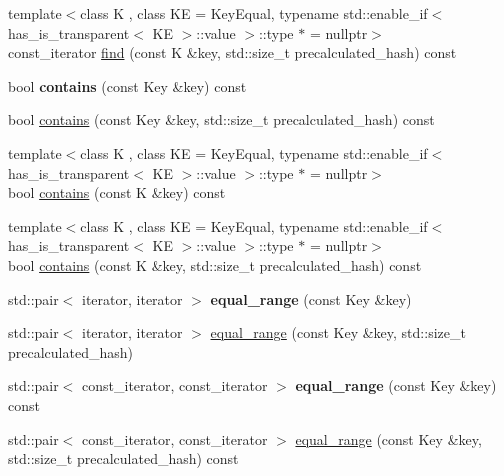 \begin{DoxyCompactItemize}
\item 
{\footnotesize template$<$class K , class KE  = Key\+Equal, typename std\+::enable\+\_\+if$<$ has\+\_\+is\+\_\+transparent$<$ K\+E $>$\+::value $>$\+::type $\ast$  = nullptr$>$ }\\const\+\_\+iterator \mbox{\hyperlink{classtsl_1_1ordered__set_a9b56494c36c62b257971a5c89ce43ace}{find}} (const K \&key, std\+::size\+\_\+t precalculated\+\_\+hash) const
\item 
\mbox{\label{classtsl_1_1ordered__set_a75f3c4a9c769412558086ce4b9646f79}} 
bool {\bfseries contains} (const Key \&key) const
\item 
bool \mbox{\hyperlink{classtsl_1_1ordered__set_a95347e23841cb607b1fe291da16a045a}{contains}} (const Key \&key, std\+::size\+\_\+t precalculated\+\_\+hash) const
\item 
{\footnotesize template$<$class K , class KE  = Key\+Equal, typename std\+::enable\+\_\+if$<$ has\+\_\+is\+\_\+transparent$<$ K\+E $>$\+::value $>$\+::type $\ast$  = nullptr$>$ }\\bool \mbox{\hyperlink{classtsl_1_1ordered__set_a90f5653e37108274b91d34666a9ef7a9}{contains}} (const K \&key) const
\item 
{\footnotesize template$<$class K , class KE  = Key\+Equal, typename std\+::enable\+\_\+if$<$ has\+\_\+is\+\_\+transparent$<$ K\+E $>$\+::value $>$\+::type $\ast$  = nullptr$>$ }\\bool \mbox{\hyperlink{classtsl_1_1ordered__set_a68862ad41770b6bf845c663fc119a340}{contains}} (const K \&key, std\+::size\+\_\+t precalculated\+\_\+hash) const
\item 
\mbox{\label{classtsl_1_1ordered__set_ae442941c8eb016435f66dded57c1fbc8}} 
std\+::pair$<$ iterator, iterator $>$ {\bfseries equal\+\_\+range} (const Key \&key)
\item 
std\+::pair$<$ iterator, iterator $>$ \mbox{\hyperlink{classtsl_1_1ordered__set_a75a3625f26abb12ef09c41e18a12bbef}{equal\+\_\+range}} (const Key \&key, std\+::size\+\_\+t precalculated\+\_\+hash)
\item 
\mbox{\label{classtsl_1_1ordered__set_ae6ff69af2f016680ef22beb1d4e6c9a9}} 
std\+::pair$<$ const\+\_\+iterator, const\+\_\+iterator $>$ {\bfseries equal\+\_\+range} (const Key \&key) const
\item 
std\+::pair$<$ const\+\_\+iterator, const\+\_\+iterator $>$ \mbox{\hyperlink{classtsl_1_1ordered__set_a3c95b8ec1f1f4432b5b26ff5a83db5b0}{equal\+\_\+range}} (const Key \&key, std\+::size\+\_\+t precalculated\+\_\+hash) const

\end{DoxyCompactItemize}
